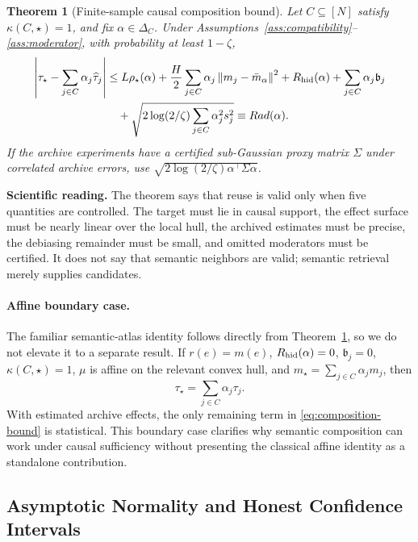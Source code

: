 \documentclass[11pt]{article}
\numberwithin{equation}{section}
\newtheorem{theorem}{Theorem}[section]
\newcommand{\1}{\mathbf 1}
\newcommand{\norm}[1]{\left\lVert #1\right\rVert}
\newcommand{\abs}[1]{\left\lvert #1\right\rvert}
\begin{document}
\begin{theorem}[Finite-sample causal composition bound]
\label{thm:composition}
Let \(C\subseteq[N]\) satisfy \(\kappa(C,\star)=1\), and fix \(\alpha\in\Delta_C\).  Under Assumptions~\ref{ass:compatibility}--\ref{ass:moderator}, with probability at least \(1-\zeta\),
\begin{equation}
\label{eq:composition-bound}
\begin{aligned}
\abs{\tau_\star-\sum_{j\in C}\alpha_j\widehat\tau_j}
&\le
L\rho_\star(\alpha)
+\frac{H}{2}\sum_{j\in C}\alpha_j\norm{m_j-\bar m_\alpha}^2
+R_{\rm hid}(\alpha)
+\sum_{j\in C}\alpha_j\mathfrak b_j \\
&\quad
+\sqrt{2\log(2/\zeta)\sum_{j\in C}\alpha_j^2s_j^2}
\equiv Rad(\alpha).
\end{aligned}
\end{equation}
If the archive experiments have a certified sub-Gaussian proxy matrix \(\Sigma\) under correlated archive errors, use \(\sqrt{2\log(2/\zeta)\alpha^\top\Sigma\alpha}\).
\end{theorem}

\noindent\textbf{Scientific reading.}
The theorem says that reuse is valid only when five quantities are controlled.  The target must lie in causal support, the effect surface must be nearly linear over the local hull, the archived estimates must be precise, the debiasing remainder must be small, and omitted moderators must be certified.  It does not say that semantic neighbors are valid; semantic retrieval merely supplies candidates.

\paragraph{Affine boundary case.}
The familiar semantic-atlas identity follows directly from
Theorem~\ref{thm:composition}, so we do not elevate it to a separate result.
If \(r(e)=m(e)\), \(R_{\rm hid}(\alpha)=0\), \(\mathfrak b_j=0\),
\(\kappa(C,\star)=1\), \(\mu\) is affine on the relevant convex hull, and
\(m_\star=\sum_{j\in C}\alpha_jm_j\), then
\[
  \tau_\star=\sum_{j\in C}\alpha_j\tau_j.
\]
With estimated archive effects, the only remaining term in
\eqref{eq:composition-bound} is statistical.  This boundary case clarifies
why semantic composition can work under causal sufficiency without presenting
the classical affine identity as a standalone contribution.

\subsection{Asymptotic Normality and Honest Confidence Intervals}
\end{document}
